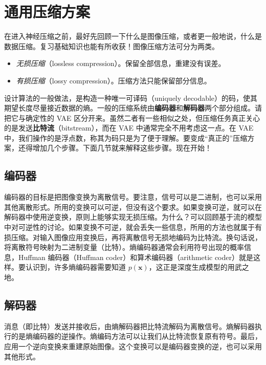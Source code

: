 \section{通用压缩方案}
\label{sec:10-02}

在进入神经压缩之前，最好先回顾一下什么是图像压缩，或者更一般地说，什么是数据压缩。复习基础知识也能有所收获！图像压缩方法可分为两类。
\begin{itemize}
  \item \emph{无损压缩}（lossless compression）。保留全部信息，重建没有误差。
  \item \emph{有损压缩}（lossy compression）。压缩方法只能保留部分信息。
\end{itemize}

设计算法的一般做法，是构造一种唯一可译码（uniquely decodable）的码，使其期望长度尽量接近数据的熵。一般的压缩系统由\textbf{编码器}和\textbf{解码器}两个部分组成。请把它与确定性的 VAE 区分开来。虽然二者有一些相似之处，但压缩任务真正关心的是发送\textbf{比特流}（bitstream），而在 VAE 中通常完全不用考虑这一点。在 VAE 中，我们操作的是浮点数，称其为码只是为了便于理解。要变成“真正的”压缩方案，还得增加几个步骤。下面几节就来解释这些步骤。现在开始！

\subsection{编码器}

编码器的目标是把图像变换为离散信号。要注意，信号可以是二进制，也可以采用其他离散形式。所用的变换可以可逆，但没有这个要求。如果变换可逆，就可以在解码器中使用逆变换，原则上能够实现无损压缩。为什么？可以回顾基于流的模型中对可逆性的讨论。如果变换不可逆，就会丢失一些信息，所用的方法也就属于有损压缩。对输入图像应用变换后，再将离散信号无损地编码为比特流。换句话说，将离散符号映射为二进制变量（比特）。熵编码器通常会利用符号出现的概率信息，Huffman 编码器（Huffman coder）和算术编码器（arithmetic coder）就是这样。要认识到，许多熵编码器需要知道 $p(\mathbf x)$，这正是深度生成模型的用武之地。

\subsection{解码器}

消息（即比特）发送并接收后，由熵解码器把比特流解码为离散信号。熵解码器执行的是熵编码器的逆操作。熵编码方法可以让我们从比特流恢复原有符号。最后，应用一个逆向变换来重建原始图像。这个变换可以是编码器变换的逆，也可以采用其他形式。

